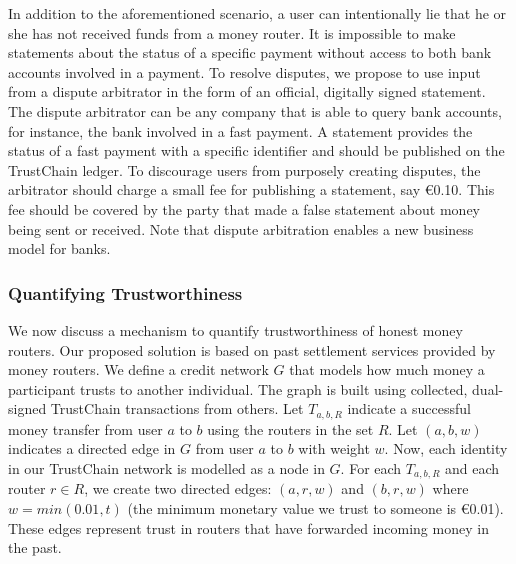 In addition to the aforementioned scenario, a user can intentionally lie that he or she has not received funds from a money router. %
It is impossible to make statements about the status of a specific payment without access to both bank accounts involved in a payment.
To resolve disputes, we propose to use input from a dispute arbitrator in the form of an official, digitally signed statement.
The dispute arbitrator can be any company that is able to query bank accounts, for instance, the bank involved in a fast payment.
A statement provides the status of a fast payment with a specific identifier and should be published on the TrustChain ledger.
To discourage users from purposely creating disputes, the arbitrator should charge a small fee for publishing a statement, say \euro 0.10.
This fee should be covered by the party that made a false statement about money being sent or received.
Note that dispute arbitration enables a new business model for banks.




\subsubsection*{Quantifying Trustworthiness}
\label{sec:estimate_trust}
We now discuss a mechanism to quantify trustworthiness of honest money routers.
Our proposed solution is based on past settlement services provided by money routers.
We define a credit network $ G $ that models how much money a participant trusts to another individual.
The graph is built using collected, dual-signed TrustChain transactions from others.
Let $ T_{a,b,R} $ indicate a successful money transfer from user $ a $ to $ b $ using the routers in the set $ R $. %
Let $ (a, b, w) $ indicates a directed edge in $ G $ from user $ a $ to $ b $ with weight $ w $.
Now, each identity in our TrustChain network is modelled as a node in $ G $.
For each $ T_{a,b,R} $ and each router $ r \in R $, we create two directed edges: $ (a, r, w) $ and $ (b, r, w) $ where $ w = min(0.01, t) $ (the minimum monetary value we trust to someone is \euro 0.01).
These edges represent trust in routers that have forwarded incoming money in the past.


